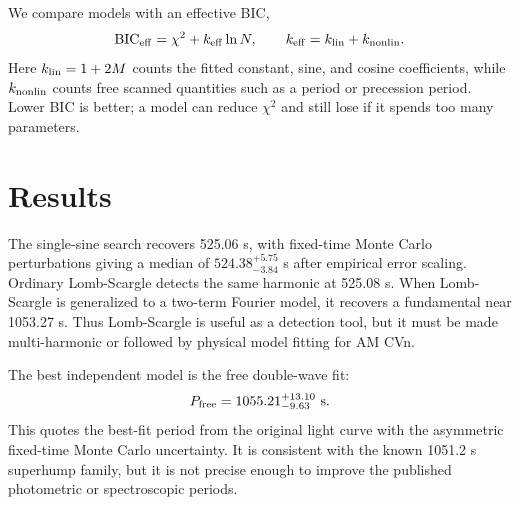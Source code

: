 \documentclass[11pt]{article}
\begin{document}
We compare models with an effective BIC,
\[
{\rm BIC}_{\rm eff}=\chi^2+k_{\rm eff}\ln N,\qquad
k_{\rm eff}=k_{\rm lin}+k_{\rm nonlin}.
\]
Here \(k_{\rm lin}=1+2M\) counts the fitted constant, sine, and cosine
coefficients, while \(k_{\rm nonlin}\) counts free scanned quantities such as a
period or precession period.  Lower BIC is better; a model can reduce
\(\chi^2\) and still lose if it spends too many parameters.

\section{Results}

The single-sine search recovers 525.06 s, with fixed-time Monte Carlo
perturbations giving a median of \(524.38^{+5.75}_{-3.84}\) s after empirical
error scaling.  Ordinary Lomb-Scargle detects the same harmonic at 525.08 s.
When Lomb-Scargle is generalized to a two-term Fourier model, it recovers a
fundamental near 1053.27 s.  Thus Lomb-Scargle is useful as a detection tool,
but it must be made multi-harmonic or followed by physical model fitting for AM
CVn.

The best independent model is the free double-wave fit:
\[
P_{\rm free}=1055.21^{+13.10}_{-9.63}~{\rm s}.
\]
This quotes the best-fit period from the original light curve with the
asymmetric fixed-time Monte Carlo uncertainty.  It is consistent with the known
1051.2 s superhump family, but it is not precise enough to improve the
published photometric or spectroscopic periods.

\begin{table}[H]
\centering
\caption{AM CVn model ladder using effective BIC.  \(\Delta{\rm BIC}_{\rm eff}\)
is measured relative to the best free double-wave model; positive values are
worse.}
\label{tab:model-ladder}
\end{table}
\end{document}

